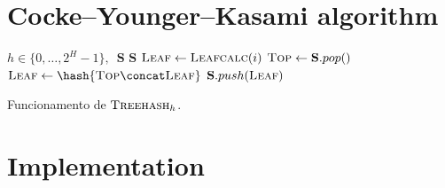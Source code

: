 \documentclass[12pt]{article}
\begin{document}
\section{Cocke–Younger–Kasami algorithm}\label{sec:cyk}


\begin{algorithm}
  \begin{algorithmic}
    \REQUIRE{}  $h \in \{0, \dots, 2^{H} - 1\}, \enspace \mathbf{S}$
    \ENSURE{}  $\mathbf{S}$ 
    \STATE{}  $\textsc{Leaf} \leftarrow \textsc{Leafcalc}(i)$
      \STATE{}  $\textsc{Top} \leftarrow \mathbf{S}.pop()$
      \STATE{}  $\textsc{Leaf} \leftarrow
        \hash{\textsc{Top} \concat \textsc{Leaf}}$
    \ENDWHILE{}
    \STATE{}  $\mathbf{S}.push(\textsc{Leaf})$
  \end{algorithmic}
  \caption{Funcionamento de $\textsc{Treehash}_{h}$.}\label{alg:treehash}
\end{algorithm}

\section{Implementation}\label{sec:imp}



\end{document}
